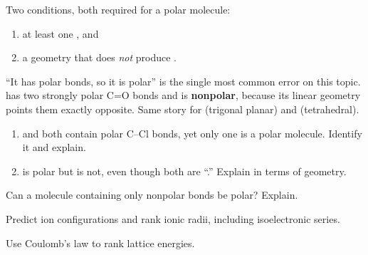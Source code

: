 \documentclass{apchem-notes}
\begin{document}
Two conditions, both required for a polar molecule:
\begin{enumerate}[leftmargin=*,itemsep=0.15em]
  \item at least one , and
  \item a geometry that does \emph{not} produce
        .
\end{enumerate}

\begin{apctrap}
``It has polar bonds, so it is polar'' is the single most common error on
this topic.  has two strongly polar C=O bonds and is
\textbf{nonpolar}, because its linear geometry points them exactly opposite.
Same story for  (trigonal planar) and  (tetrahedral).
\end{apctrap}


\begin{enumerate}[leftmargin=*,itemsep=0.4em]
  \item {} and  both contain polar C--Cl bonds, yet only
        one is a polar molecule. Identify it and explain.
  \item {} is polar but  is not, even though both are
        ``.'' Explain in terms of geometry.
\end{enumerate}

\begin{exitticket}
Can a molecule containing only nonpolar bonds be polar? Explain.
\end{exitticket}


\begin{objectives}
  \item Predict ion configurations and rank ionic radii, including
        isoelectronic series.
  \item Use Coulomb's law to rank lattice energies.
\end{objectives}
\end{document}
